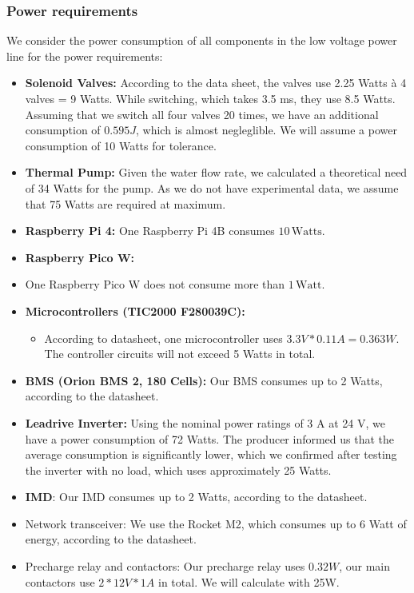 \subsubsection*{Power requirements}
We consider the power consumption of all components in the low voltage power line for the power requirements:
\begin{itemize}
    \item \textbf{Solenoid Valves:} According to the data sheet, the valves use 2.25 Watts à 4 valves = 9 Watts. While switching, which takes 3.5 ms, they use 8.5 Watts.
    Assuming that we switch all four valves 20 times, we have an additional consumption of \(0.595 J\), which is almost negleglible. We will assume a power consumption of 10 Watts for tolerance.
    \item \textbf{Thermal Pump:} Given the water flow rate, we calculated a theoretical need of 34 Watts for the pump. As we do not have experimental data, we assume that 75 Watts are required at maximum.
    
    \item \textbf{Raspberry Pi 4:} One Raspberry Pi 4B consumes \(10 \, \text{Watts}\).
    \item \textbf{Raspberry Pico W:}
    \item One Raspberry Pico W does not consume more than \(1 \, \text{Watt}\). 

    \item \textbf{Microcontrollers (TIC2000 F280039C):}
    \begin{itemize}
        \item According to datasheet, one microcontroller uses \(3.3V * 0.11 A = 0.363 W \). The controller circuits will not exceed 5 Watts in total. 
    \end{itemize}

    \item \textbf{BMS (Orion BMS 2, 180 Cells):}
       Our BMS consumes up to 2 Watts, according to the datasheet.

    \item \textbf{Leadrive Inverter:} Using the nominal power ratings of 3 A at 24 V, we have a power consumption of 72 Watts. The producer informed us that the average consumption is significantly lower,
    which we confirmed after testing the inverter with no load, which uses approximately 25 Watts.
    \item \textbf{IMD}: Our IMD consumes up to 2 Watts, according to the datasheet.
    \item Network transceiver: We use the Rocket M2, which consumes up to 6 Watt of energy, according to the datasheet.
    \item Precharge relay and contactors: Our precharge relay uses \(0.32 W \), our main contactors use \(2 * 12V * 1A\) in total. We will calculate with 25W.
\end{itemize}

